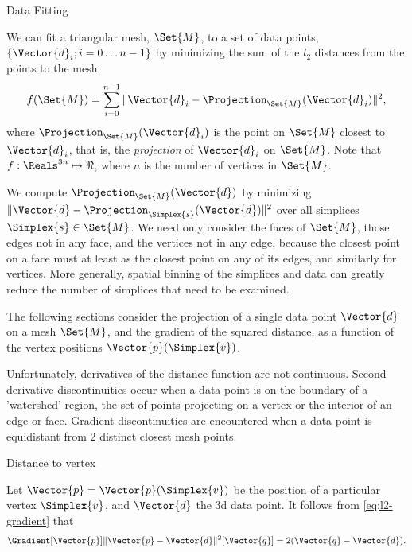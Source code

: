 \begin{plSection}{Data Fitting}
\label{sec:data-fitting}

We can fit a triangular mesh, $\Set{M}$, to a set of data points, 
$\{\Vector{d}_i; i=0 \ldots n-1\}$
by minimizing the sum of the $l_2$ distances from the points to the mesh:
\begin{equation}
f(\Set{M}) = \sum_{i=0}^{n-1} 
\|\Vector{d}_i-\Projection_\Set{M} (\Vector{d}_i)\|^2 ,
\end{equation}
where $\Projection_\Set{M} (\Vector{d}_i)$ 
is the point on $\Set{M}$ closest to $\Vector{d}_i$,
that is, the {\em projection} of $\Vector{d}_i$ on $\Set{M}$.
Note that $f:\Reals^{3n} \mapsto \Re$,
where $n$ is the number of vertices in $\Set{M}$.

We compute $\Projection_\Set{M} (\Vector{d})$ by minimizing  
$\|\Vector{d}-\Projection_\Simplex{s} (\Vector{d})\|^2$
over all simplices $\Simplex{s} \in \Set{M}$.
We need only consider the faces of $\Set{M}$,
those edges not in any face,
and the vertices not in any edge,
because the closest point on a face must at least
as the closest point on any of its edges,
and similarly for vertices.
More generally, spatial binning of the simplices and data can greatly
reduce the number of simplices that need to be examined.

The following sections consider the projection of a single
data point $\Vector{d}$ on a mesh $\Set{M}$,
and the gradient of the squared distance,
as a function of the vertex positions $\Vector{p}(\Simplex{v})$.

Unfortunately, derivatives of the distance function are not continuous.
Second derivative discontinuities occur
when a data point is on the boundary
of a 'watershed' region, the set of points
projecting on a vertex or the interior of an edge or face.
Gradient discontinuities are encountered
when a data point is equidistant from 2 distinct closest mesh points.

\begin{plSection}{Distance to vertex}
\label{sec:Distance-to-vertex}

Let $\Vector{p} = \Vector{p}(\Simplex{v})$ 
be the position of a particular vertex $\Simplex{v}$,
and $\Vector{d}$ the 3d data point.
It follows from \cref{eq:l2-gradient} that
\begin{equation}
\label{eq:vertex-distance-gradient}
\Gradient[\Vector{p}]{\|\Vector{p}-\Vector{d}\|^2}[\Vector{q}] 
= 2 ( \Vector{q}-\Vector{d} ).
\end{equation}


\end{plSection}
\end{plSection}

